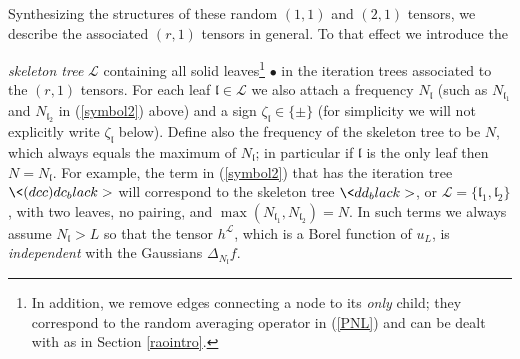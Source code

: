 \documentclass[11 pt,reqno]{amsart}
\theoremstyle{definition}
\theoremstyle{remark}
\numberwithin{equation}{section}
\newcommand{\Lc}{\mathcal{L}}
\newcommand{\lf}{\mathfrak{l}}
\begin{document}
Synthesizing the structures of these random $(1,1)$ and $(2,1)$ tensors, we describe the associated $(r,1)$ tensors in general. To that effect we introduce the {\emph{skeleton tree} $\Lc$ containing all solid leaves\footnote{In addition, we remove edges connecting a node to its \emph{only} child; they correspond to the random averaging operator in (\ref{PNL}) and can be dealt with as in Section \ref{raointro}.} $\bullet$ in the iteration trees associated to the $(r,1)$ tensors. 
 For each leaf $\lf\in \Lc$ we also attach a frequency $N_\lf$ (such as $N_{\lf_1}$ and $N_{\lf_2}$ in (\ref{symbol2}) above) and a sign $\zeta_\lf\in\{\pm\}$ (for simplicity we will not explicitly write $\zeta_\lf$ below). Define also the frequency of the skeleton tree to be $N$, which always equals the maximum of $N_\lf$; in particular if $\lf$ is the only leaf then $N=N_\lf$. For example, the term in (\ref{symbol2}) that has the iteration tree $\<(dcc)dc_black>$ will correspond to the skeleton tree $\<dd_black>$, or $\Lc =\{\lf_1, \lf_2\}$, with two leaves, no pairing, and $\max (N_{\lf_1}, N_{\lf_2}) = N$. In such terms we always assume $N_\lf>L$ so that the tensor $h^\Lc$, which is a Borel function of $u_L$, is \emph{independent} with the Gaussians $\Delta_{N_\lf}f$.

}
\end{document}
